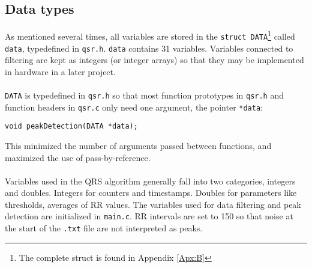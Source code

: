 \subsection{Data types}
As mentioned several times, all variables are stored in the \texttt{struct DATA}\footnote{The complete struct is found in Appendix \eqref{Apx:B}} called \texttt{data}, typedefined in \texttt{qsr.h}. 
\texttt{data} contains 31 variables. Variables connected to filtering are kept as integers (or integer arrays) so that they may be implemented in hardware in a later project. \\
\\
\texttt{DATA} is typedefined in \texttt{qsr.h} so that most function prototypes in \texttt{qsr.h} and function headers in \texttt{qsr.c} only need one argument, the pointer \texttt{*data}:

\begin{lstlisting}
void peakDetection(DATA *data);
\end{lstlisting}

This minimized the number of arguments passed between functions, and maximized the use of pass-by-reference.\\ 
\\
Variables used in the QRS algorithm generally fall into two categories, integers and doubles. Integers for counters and timestamps. Doubles for parameters like thresholds, averages of RR values. The variables used for data filtering and peak detection are initialized in \texttt{main.c}. RR intervals are set to 150 so that noise at the start of the \texttt{.txt} file are not interpreted as peaks.\\